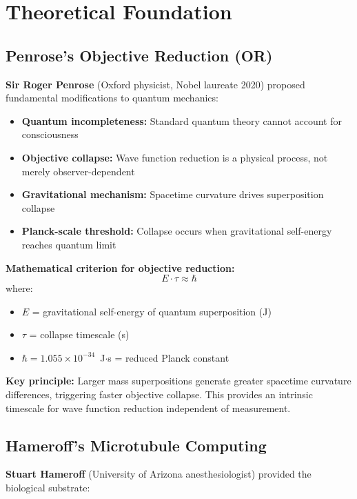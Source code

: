 \section{Theoretical Foundation}

\subsection{Penrose's Objective Reduction (OR)}

\textbf{Sir Roger Penrose} (Oxford physicist, Nobel laureate 2020) proposed fundamental modifications to quantum mechanics:

\begin{itemize}
\item \textbf{Quantum incompleteness:} Standard quantum theory cannot account for consciousness
\item \textbf{Objective collapse:} Wave function reduction is a physical process, not merely observer-dependent
\item \textbf{Gravitational mechanism:} Spacetime curvature drives superposition collapse
\item \textbf{Planck-scale threshold:} Collapse occurs when gravitational self-energy reaches quantum limit
\end{itemize}

\textbf{Mathematical criterion for objective reduction:}
\begin{equation}
\label{eq:or-criterion}
E \cdot \tau \approx \hbar
\end{equation}
where:
\begin{itemize}
\item $E$ = gravitational self-energy of quantum superposition (J)
\item $\tau$ = collapse timescale (s)
\item $\hbar = 1.055 \times 10^{-34}$~J$\cdot$s = reduced Planck constant
\end{itemize}

\textbf{Key principle:} Larger mass superpositions generate greater spacetime curvature differences, triggering faster objective collapse. This provides an intrinsic timescale for wave function reduction independent of measurement.

\subsection{Hameroff's Microtubule Computing}

\textbf{Stuart Hameroff} (University of Arizona anesthesiologist) provided the biological substrate:

